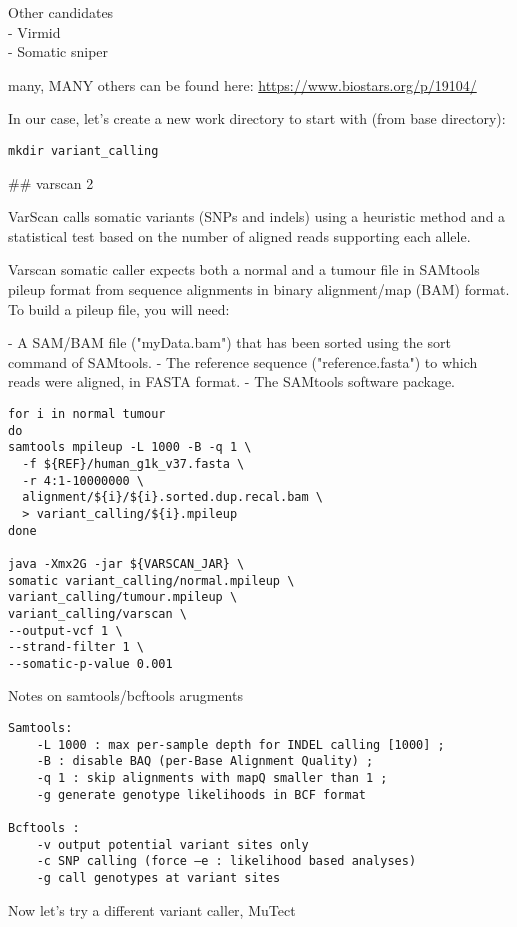 Other candidates \\
- Virmid \\
- Somatic sniper

many, MANY others can be found here:
\url{https://www.biostars.org/p/19104/}


In our case, let's create a new work directory to start with (from base directory):

\begin{lstlisting}
mkdir variant_calling
\end{lstlisting}

## varscan 2

VarScan calls somatic variants (SNPs and indels) using a heuristic method and a statistical test based on the number of aligned reads supporting each allele.


Varscan somatic caller expects both a normal and a tumour file in SAMtools pileup format from sequence alignments in binary alignment/map (BAM) format. To build a pileup file, you will need:

- A SAM/BAM file ("myData.bam") that has been sorted using the sort command of SAMtools.
- The reference sequence ("reference.fasta") to which reads were aligned, in FASTA format.
- The SAMtools software package.


\begin{lstlisting}
for i in normal tumour
do
samtools mpileup -L 1000 -B -q 1 \
  -f ${REF}/human_g1k_v37.fasta \
  -r 4:1-10000000 \
  alignment/${i}/${i}.sorted.dup.recal.bam \
  > variant_calling/${i}.mpileup
done

java -Xmx2G -jar ${VARSCAN_JAR} \
somatic variant_calling/normal.mpileup \
variant_calling/tumour.mpileup \
variant_calling/varscan \
--output-vcf 1 \
--strand-filter 1 \
--somatic-p-value 0.001 
\end{lstlisting}

Notes on samtools/bcftools arugments
\begin{verbatim}
Samtools:
	-L 1000 : max per-sample depth for INDEL calling [1000] ; 
	-B : disable BAQ (per-Base Alignment Quality) ; 
	-q 1 : skip alignments with mapQ smaller than 1 ; 
	-g generate genotype likelihoods in BCF format

Bcftools :
	-v output potential variant sites only
	-c SNP calling (force –e : likelihood based analyses)
	-g call genotypes at variant sites
\end{verbatim}

Now let's try a different variant caller, MuTect\\

